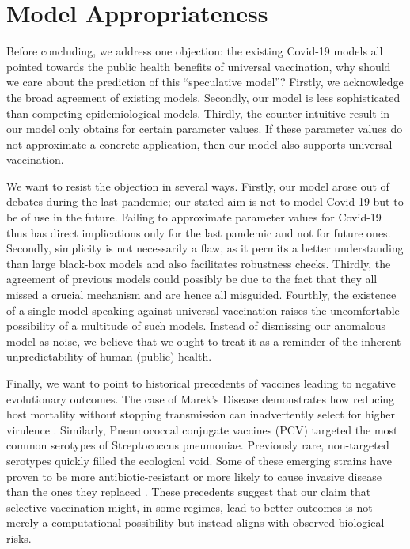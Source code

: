 \documentclass[a4paper,12pt]{article}
\begin{document}
\section{Model Appropriateness}\label{sec:Objection}
Before concluding, we address one objection: the existing Covid-19 models all pointed towards the public health benefits of universal vaccination, why should we care about the prediction of this ``speculative model''? Firstly, we acknowledge the broad agreement of existing models. Secondly, our model is less sophisticated than competing epidemiological models. Thirdly, the counter-intuitive result in our model only obtains for certain parameter values. If these parameter values do not approximate a concrete application, then our model also supports universal vaccination.

We want to resist the objection in several ways. Firstly, our model arose out of debates during the last pandemic; our stated aim is not to model Covid-19 but to be of use in the future. Failing to approximate parameter values for Covid-19 thus has direct implications only for the last pandemic and not for future ones. Secondly, simplicity is not necessarily a flaw, as it permits a better understanding than large black-box models and also facilitates robustness checks. Thirdly, the agreement of previous models could possibly be due to the fact that they all missed a crucial mechanism and are hence all misguided. Fourthly, the existence of a single model speaking against universal vaccination raises the uncomfortable possibility of a multitude of such models. Instead of dismissing our anomalous model as noise, we believe that we ought to treat it as a reminder of the inherent unpredictability of human (public) health.

Finally, we want to point to historical precedents of vaccines leading to negative evolutionary outcomes. The case of Marek's Disease demonstrates how reducing host mortality without stopping transmission can inadvertently select for higher virulence \cite{Read2015}. Similarly, Pneumococcal conjugate vaccines (PCV) targeted the most common serotypes of Streptococcus pneumoniae. Previously rare, non-targeted serotypes quickly filled the ecological void. Some of these emerging strains have proven to be more antibiotic-resistant or more likely to cause invasive disease than the ones they replaced \cite{Hanquet2022}. These precedents suggest that our claim that selective vaccination might, in some regimes, lead to better outcomes is not merely a computational possibility but instead aligns with observed biological risks.
\end{document}
